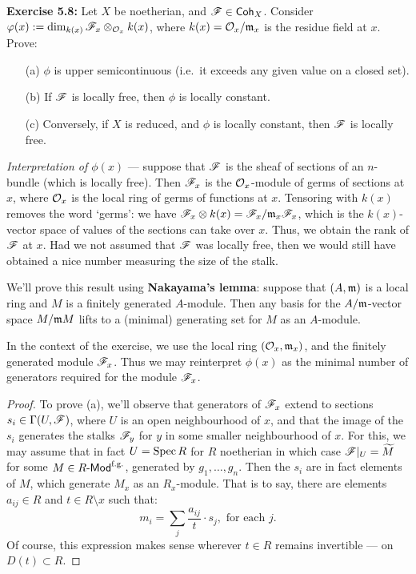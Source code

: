 \documentclass[11pt]{article}
\newcommand{\Index}[1]{\index{#1}#1}
\begin{document}
\begin{II.5 Sheaves of Modules}
\begin{itemise}
\item \textbf{Exercise 5.8:}
Let $X$ be noetherian, and $\mathscr{F}\in\operatorname{{\mathsf{Coh}}}_X$. Consider
$\varphi(x):=\dim_{k(x)}\mathscr{F}_x\otimes_{\mathcal{O}_x}k(x)$, where
$k(x)=\mathcal{O}_x/\mathfrak{m}_x$ is the residue field at $x$. Prove:
\begin{enumerate}\squishlist
\item[(a)] $\phi$ is \Index{upper semicontinuous} (i.e.\ it exceeds any given
value on a closed set).
\item[(b)] If $\mathscr{F}$ is locally free, then $\phi$ is locally constant.
\item[(c)] Conversely, if $X$ is reduced, and $\phi$ is locally constant, then
$\mathscr{F}$ is locally free.
\end{enumerate}
\emph{Interpretation of $\phi(x)$} --- suppose that $\mathscr{F}$ is the sheaf of
sections of an $n$-bundle (which is locally free). Then $\mathscr{F}_x$ is the
$\mathcal{O}_x$-module of germs of sections at $x$, where $\mathcal{O}_x$ is the local ring
of germs of functions at $x$. Tensoring with $k(x)$ removes the word `germs': we
have $\mathscr{F}_x\otimes k(x)=\mathscr{F}_x/\mathfrak{m}_x\mathscr{F}_x$, which is the $k(x)$-vector
space of values of the sections can take over $x$. Thus, we obtain the rank of
$\mathscr{F}$ at $x$. Had we not assumed that $\mathscr{F}$ was locally free, then we would
still have obtained a nice number measuring the size of the stalk.

\INDENT We'll prove this result using \textbf{\Index{Nakayama's lemma}}: suppose
that $(A,\mathfrak{m})$ is a local ring and $M$ is a finitely generated $A$-module.
Then any basis for the $A/\mathfrak{m}$-vector space $M/\mathfrak{m} M$ lifts to a (minimal)
generating set for $M$ as an $A$-module.

\INDENT In the context of the exercise, we use the local ring
$(\mathcal{O}_x,\mathfrak{m}_x)$, and the finitely generated module $\mathscr{F}_x$. Thus we may
reinterpret $\phi(x)$ as the minimal number of generators required for the
module $\mathscr{F}_x$.

\begin{proof} To prove (a), we'll observe that generators of $\mathscr{F}_x$ extend to
sections $s_i\in\Gamma(U,\mathscr{F})$, where $U$ is an open neighbourhood of $x$, and
that the image of the $s_i$ generates the stalks $\mathscr{F}_y$ for $y$ in some
smaller neighbourhood of $x$. For this, we may assume that in fact $U=\operatorname{Spec} R$
for $R$ noetherian in which case $\mathscr{F}|_U=\widetilde M$ for some $M\in
R\operatorname{{\mathsf{\!-Mod}}}^\text{f.g.}$, generated by $g_1,\ldots,g_n$. Then the $s_i$ are in
fact elements of $M$, which generate $M_x$ as an $R_x$-module. That is to say,
there are elements $a_{ij}\in R$ and $t\in R\setminus x$ such that:
\[m_i=\sum_{j}\frac{a_{ij}}{t}\cdot s_j, \text{ for each $j$}.\]
Of course, this expression makes sense wherever $t\in R$ remains invertible ---
on $D(t)\subset R$.


\end{proof}
\end{itemise}
\end{II.5 Sheaves of Modules}
\end{document}
